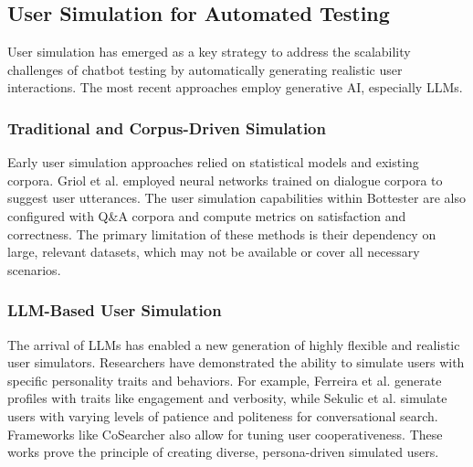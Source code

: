 \subsection{User Simulation for Automated Testing}

User simulation has emerged as a key strategy to
address the scalability challenges of chatbot testing
by automatically generating realistic user interactions.
The most recent approaches employ generative \acl{AI},
especially \acp {LLM}.

\subsubsection{Traditional and Corpus-Driven Simulation}

Early user simulation approaches
relied on statistical models and existing corpora.
Griol et al. \autocite{griolAutomaticDialogSimulation2013}
employed neural networks trained on dialogue corpora
to suggest user utterances.
The user simulation capabilities within Bottester
\autocite{vasconcelosBottesterTestingConversational2017}
are also configured with Q\&A corpora
and compute metrics on satisfaction and correctness.
The primary limitation of these methods is
their dependency on large, relevant datasets,
which may not be available or cover all necessary scenarios.

\subsubsection{LLM-Based User Simulation}

The arrival of \acp{LLM} has enabled a new generation
of highly flexible and realistic user simulators.
Researchers have demonstrated the ability
to simulate users with specific personality traits and behaviors.
For example, Ferreira et al. \autocite{ferreiraMultitraitUserSimulation2024}
generate profiles with traits like engagement and verbosity,
while Sekulic et al. \autocite{sekulicSimulatingConversationalSearch2024}
simulate users with varying levels of patience and politeness for conversational search.
Frameworks like CoSearcher \autocite{salleStudyingEffectivenessConversational2021}
also allow for tuning user cooperativeness.
These works prove the principle of creating diverse, persona-driven simulated users.

